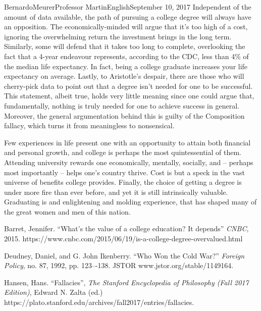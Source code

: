 \documentclass[12pt,letterpaper]{article}
\begin{document}
\begin{mla}{Bernardo}{Meurer}{Professor Martin}{English}{September 10, 2017}
    Independent of the amount of data available, the path of pursuing a college 
    degree will always have an opposition. The economically-minded will argue 
    that it's too high of a cost, ignoring the overwhelming return the 
    investment brings in the long term. Similarly, some will defend that it 
    takes too long to complete, overlooking the fact that a 4-year endeavour 
    represents, according to the CDC, less than 4\% of the median life 
    expectancy. In fact, being a college graduate increases your life 
    expectancy on average. Lastly, to Aristotle's despair, there are those who 
    will cherry-pick data to point out that a degree isn't needed for one to be 
    successful. This statement, albeit true, holds very little meaning since 
    one could argue that, fundamentally, nothing is truly needed for one to 
    achieve success in general. Moreover, the general argumentation behind this 
    is guilty of the Composition fallacy, which turns it from meaningless to nonsensical.

    Few experiences in life present one with an opportunity to attain both 
    financial and personal growth, and college is perhaps the most 
    quintessential of them. Attending university rewards one economically, 
    mentally, socially, and -- perhaps most importantly -- helps one's country 
    thrive. Cost is but a speck in the vast universe of benefits college 
    provides. Finally, the choice of getting a degree is under more fire than 
    ever before, and yet it is still intrinsically valuable. Graduating is and 
    enlightening and molding experience, that has shaped many of the great 
    women and men of this nation.
    
    \begin{workscited}
    \bibent
    Barret, Jennifer. ``What's the value of a college education? It depends'' \textit{CNBC}, 2015. https://www.cnbc.com/2015/06/19/is-a-college-degree-overvalued.html

    \bibent
    Deudney, Daniel, and G. John Ikenberry. ``Who Won the Cold War?'' \textit{Foreign Policy}, no. 87, 1992, pp. 123–-138. JSTOR www.jstor.org/stable/1149164.

    \bibent
    Hansen, Hans. ``Fallacies'', \textit{The Stanford Encyclopedia of Philosophy (Fall 2017 Edition)}, Edward N. Zalta (ed.) https://plato.stanford.edu/archives/fall2017/entries/fallacies.
    

\end{workscited}
\end{mla}
\end{document}
